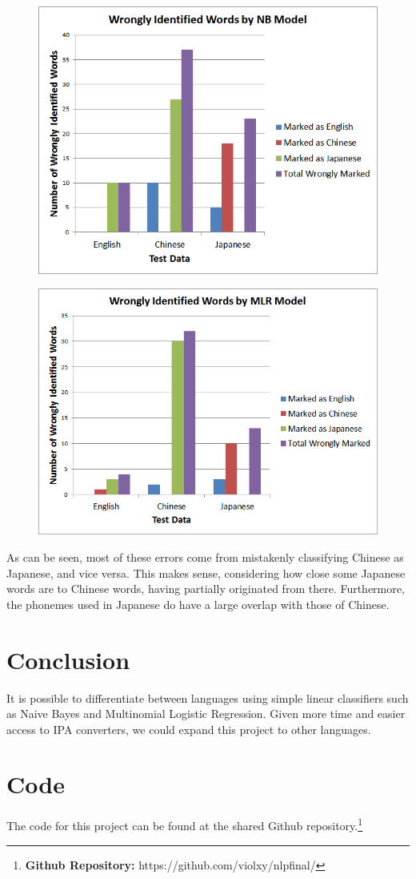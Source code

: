 \documentclass[a4paper]{article}
\begin{document}
\begin{figure}[H]
\centering
\includegraphics[width=\textwidth]{nbgraph.png}
\end{figure}
\begin{figure}[H]
\centering
\includegraphics[width=\textwidth]{mlrgraph.png}
\end{figure}

As can be seen, most of these errors come from mistakenly classifying Chinese as Japanese, and vice versa. This makes sense, considering how close some Japanese words are to Chinese words, having partially originated from there. Furthermore, the phonemes used in Japanese do have a large overlap with those of Chinese.
\section{Conclusion}
It is possible to differentiate between languages using simple linear classifiers such as Naive Bayes and Multinomial Logistic Regression. Given more time and easier access to IPA converters, we could expand this project to other languages.\\

\section{Code}
The code for this project can be found at the shared Github repository.\footnote{\textbf{Github Repository: }https://github.com/violxy/nlpfinal/}
\end{document}
